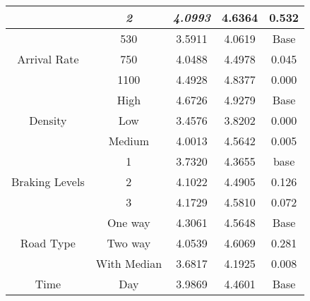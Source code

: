 \begin{small}
\begin{longtable}{|ccccc|}
                                          & \textit{2}      & \textit{4.0993}              & 4.6364                       & 0.532            \\ \hline
\multirow{3}{*}{Arrival Rate}             & 530             & 3.5911                       & 4.0619                       & Base             \\ 
                                          & 750             & 4.0488                       & 4.4978                       & 0.045            \\ 
                                          & 1100            & 4.4928                       & 4.8377                       & 0.000            \\ \hline
\multirow{3}{*}{Density}                  & High            & 4.6726                       & 4.9279                       & Base             \\ 
                                          & Low             & 3.4576                       & 3.8202                       & 0.000            \\ 
                                          & Medium          & 4.0013                       & 4.5642                       & 0.005            \\ \hline
\multirow{3}{*}{Braking Levels}           & 1               & 3.7320                       & 4.3655                       & base             \\ 
                                          & 2               & 4.1022                       & 4.4905                       & 0.126            \\ 
                                          & 3               & 4.1729                       & 4.5810                       & 0.072            \\ \hline
\multirow{3}{*}{Road Type}                & One way         & 4.3061                       & 4.5648                       & Base             \\ 
                                          & Two way         & 4.0539                       & 4.6069                       & 0.281            \\ 
                                          & With Median     & 3.6817                       & 4.1925                       & 0.008            \\ \hline
\multirow{3}{*}{Time}                     & Day             & 3.9869                       & 4.4601                       & Base             \\ 

\end{longtable}
\end{small}
